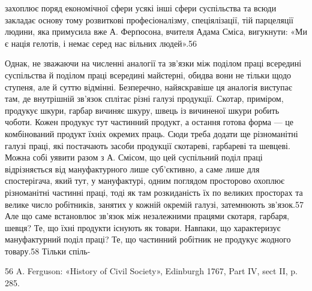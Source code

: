 захоплює поряд економічної сфери усякі інші сфери суспільства
та всюди закладає основу тому розвиткові професіоналізму,
спеціялізації, тій парцеляції людини, яка примусила вже А. Ферґюсона,
вчителя Адама Сміса, вигукнути: «Ми є нація гелотів,
і немає серед нас вільних людей».56

Однак, не зважаючи на численні аналогії та зв’язки між поділом
праці всередині суспільства й поділом праці всередині майстерні,
обидва вони не тільки щодо ступеня, але й суттю відмінні.
Безперечно, найяскравіше ця аналогія виступає там, де внутрішній
зв’язок сплітає різні галузі продукції. Скотар, приміром,
продукує шкури, гарбар вичиняє шкуру, швець із вичиненої
шкури робить чоботи. Кожен продукує тут частинний продукт,
а остання готова форма — це комбінований продукт їхніх окремих
праць. Сюди треба додати ще різноманітні галузі праці, які
постачають засоби продукції скотареві, гарбареві та шевцеві.
Можна собі уявити разом з А. Смісом, що цей суспільний поділ
праці відрізняється від мануфактурного лише суб’єктивно, а саме
лише для спостерігача, який тут, у мануфактурі, одним поглядом
просторово охоплює різноманітні частинні праці, тоді як там розкиданість
їх по великих просторах та велике число робітників,
занятих у кожній окремій галузі, затемнюють зв’язок.57 Але що
саме встановлює зв’язок між незалежними працями скотаря,
гарбаря, шевця? Те, що їхні продукти існують як товари. Навпаки,
що характеризує мануфактурний поділ праці? Те, що
частинний робітник не продукує жодного товару.58 Тільки спіль-

56 A. Ferguson: «History of Civil Society», Edinburgh 1767, Part IV,
sect II, p. 285.

